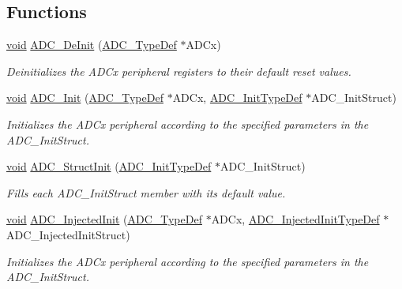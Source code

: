 \subsection*{Functions}
\begin{DoxyCompactItemize}
\item 
\hyperlink{group___n_a_m_e_ga18028b8badbf1ea7e704ccac3c488e82}{void} \hyperlink{group___a_d_c___exported___constants_ga31fa6bc09de17125e9db2830ce77c09b}{A\-D\-C\-\_\-\-De\-Init} (\hyperlink{struct_a_d_c___type_def}{A\-D\-C\-\_\-\-Type\-Def} $\ast$A\-D\-Cx)
\begin{DoxyCompactList}\small\item\em Deinitializes the A\-D\-Cx peripheral registers to their default reset values. \end{DoxyCompactList}\item 
\hyperlink{group___n_a_m_e_ga18028b8badbf1ea7e704ccac3c488e82}{void} \hyperlink{group___a_d_c___exported___constants_gabbab6038cf8691404350625e477254f9}{A\-D\-C\-\_\-\-Init} (\hyperlink{struct_a_d_c___type_def}{A\-D\-C\-\_\-\-Type\-Def} $\ast$A\-D\-Cx, \hyperlink{struct_a_d_c___init_type_def}{A\-D\-C\-\_\-\-Init\-Type\-Def} $\ast$A\-D\-C\-\_\-\-Init\-Struct)
\begin{DoxyCompactList}\small\item\em Initializes the A\-D\-Cx peripheral according to the specified parameters in the A\-D\-C\-\_\-\-Init\-Struct. \end{DoxyCompactList}\item 
\hyperlink{group___n_a_m_e_ga18028b8badbf1ea7e704ccac3c488e82}{void} \hyperlink{group___a_d_c___exported___constants_ga6c6e754d1d0a98d56e465efaf73272ec}{A\-D\-C\-\_\-\-Struct\-Init} (\hyperlink{struct_a_d_c___init_type_def}{A\-D\-C\-\_\-\-Init\-Type\-Def} $\ast$A\-D\-C\-\_\-\-Init\-Struct)
\begin{DoxyCompactList}\small\item\em Fills each A\-D\-C\-\_\-\-Init\-Struct member with its default value. \end{DoxyCompactList}\item 
\hyperlink{group___n_a_m_e_ga18028b8badbf1ea7e704ccac3c488e82}{void} \hyperlink{group___a_d_c___exported___constants_gaecfd009a438d2f93ffbbb214a9809cbf}{A\-D\-C\-\_\-\-Injected\-Init} (\hyperlink{struct_a_d_c___type_def}{A\-D\-C\-\_\-\-Type\-Def} $\ast$A\-D\-Cx, \hyperlink{struct_a_d_c___injected_init_type_def}{A\-D\-C\-\_\-\-Injected\-Init\-Type\-Def} $\ast$A\-D\-C\-\_\-\-Injected\-Init\-Struct)
\begin{DoxyCompactList}\small\item\em Initializes the A\-D\-Cx peripheral according to the specified parameters in the A\-D\-C\-\_\-\-Init\-Struct. \end{DoxyCompactList}\item 

\end{DoxyCompactItemize}
